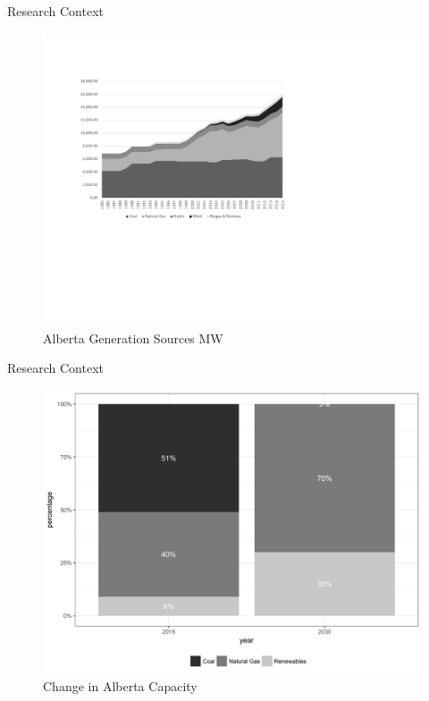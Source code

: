 \documentclass[newPxFont,numfooter,progressbar,sectionpages]{beamer}
\begin{document}

\begin{frame}[c]{Research Context}


\begin{figure}
	\centering
	\includegraphics[width=0.9\linewidth]{"figure/abEnSourcem"}
	\caption{Alberta Generation Sources MW}
	\label{fig:abensource}
\end{figure}



\end{frame}



\begin{frame}[c]{Research Context}


\begin{figure}
	\centering
	\includegraphics[width=0.8\linewidth]{"figure/capacity"}
	\caption{Change in Alberta Capacity}
	\label{fig:abensource}
\end{figure}



\end{frame}
\end{document}
